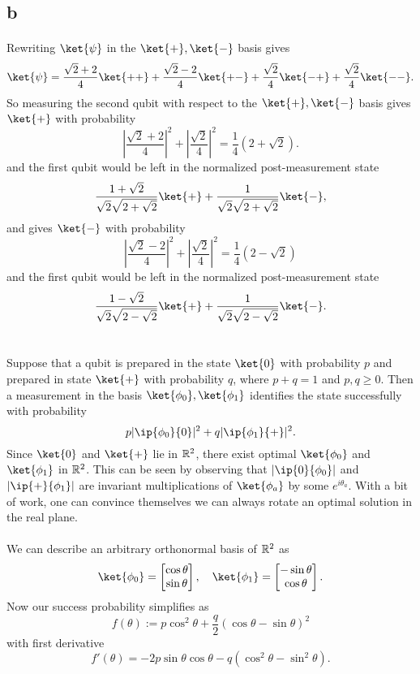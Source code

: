 \documentclass[letterpaper,12pt,oneside,onecolumn]{article}
\DeclarePairedDelimiter\abs{\lvert}{\rvert}%
\begin{document}
\subsection{b}
\paragraph{}
Rewriting $\ket{\psi}$ in the $\ket{+}, \ket{-}$ basis gives
$$\ket{\psi} = \frac{\sqrt{2} + 2}{4}\ket{++} + \frac{\sqrt{2}-2}{4}\ket{+-} + \frac{\sqrt{2}}{4}\ket{-+} + \frac{\sqrt{2}}{4}\ket{--}.$$
So measuring the second qubit with respect to the $\ket{+}, \ket{-}$ basis gives $\ket{+}$ with probability
$$|\frac{\sqrt{2}+2}{4}|^2+ |\frac{\sqrt{2}}{4}|^2 = \frac{1}{4}(2 + \sqrt{2}).$$
and the first qubit would be left in the normalized post-measurement state
$$ \frac{1 + \sqrt{2}}{\sqrt{2}\sqrt{2+\sqrt{2}}}\ket{+} + \frac{1}{\sqrt{2}\sqrt{2+\sqrt{2}}}\ket{-},$$
and gives $\ket{-}$ with probability
$$|\frac{\sqrt{2}-2}{4}|^2+ |\frac{\sqrt{2}}{4}|^2 = \frac{1}{4}(2 - \sqrt{2})$$
and the first qubit would be left in the normalized post-measurement state
$$\frac{1-\sqrt{2}}{\sqrt{2}\sqrt{2-\sqrt{2}}}\ket{+} + \frac{1}{\sqrt{2}\sqrt{2-\sqrt{2}}}\ket{-} .$$
\section{}
\paragraph{}
Suppose that a qubit is prepared in the state $\ket{0}$ with probability $p$ and prepared in state $\ket{+}$ with probability $q$, where $p+q=1$ and $p,q\geq 0$. Then a measurement in the basis $\ket{\phi_0}, \ket{\phi_1}$ identifies the state successfully with probability
$$p\abs{\ip{\phi_0}{0}}^2 + q\abs{\ip{\phi_1}{+}}^2.$$
Since $\ket{0}$ and $\ket{+}$ lie in $\mathbb{R}^2$, there exist optimal $\ket{\phi_0}$ and $\ket{\phi_1}$ in $\mathbb{R}^2$. This can be seen by observing that $\abs{\ip{0}{\phi_0}}$ and $\abs{\ip{+}{\phi_1}}$ are invariant multiplications of $\ket{\phi_a}$ by some $e^{i\theta_a}$. With a bit of work, one can convince themselves we can always rotate an optimal solution in the real plane.
\paragraph{}
We can describe an arbitrary orthonormal basis of $\mathbb{R}^2$ as
$$\ket{\phi_0} = \begin{bmatrix} \cos\theta \\ \sin\theta \end{bmatrix}, \quad \ket{\phi_1}=\begin{bmatrix}-\sin\theta \\ \cos\theta \end{bmatrix}.$$
Now our success probability simplifies as
$$f(\theta) :=p\cos^2\theta + \frac{q}{2}(\cos\theta - \sin\theta)^2$$
with first derivative
$$f'(\theta) = -2p\sin\theta\cos\theta - q(\cos^2\theta - \sin^2\theta).$$
\end{document}
